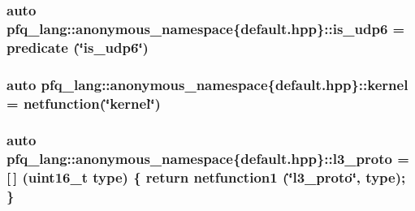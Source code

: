\hypertarget{namespacepfq__lang_1_1anonymous__namespace_02default_8hpp_03_a31e93829d19f72f4aece81f57d7cef9c}{
\subsubsection[{is\-\_\-udp6}]{\setlength{\rightskip}{0pt plus 5cm}auto pfq\-\_\-lang\-::anonymous\-\_\-namespace\{default.\-hpp\}\-::is\-\_\-udp6 = {\bf predicate} (\char`\"{}is\-\_\-udp6\char`\"{})}}\label{namespacepfq__lang_1_1anonymous__namespace_02default_8hpp_03_a31e93829d19f72f4aece81f57d7cef9c}
\hypertarget{namespacepfq__lang_1_1anonymous__namespace_02default_8hpp_03_a68a2502f951a2b671a7d0496609f5d2a}{
\subsubsection[{kernel}]{\setlength{\rightskip}{0pt plus 5cm}auto pfq\-\_\-lang\-::anonymous\-\_\-namespace\{default.\-hpp\}\-::kernel = {\bf netfunction}(\char`\"{}kernel\char`\"{})}}\label{namespacepfq__lang_1_1anonymous__namespace_02default_8hpp_03_a68a2502f951a2b671a7d0496609f5d2a}
\hypertarget{namespacepfq__lang_1_1anonymous__namespace_02default_8hpp_03_aed01dd5380a873d92397ec0d4c07abac}{
\subsubsection[{l3\-\_\-proto}]{\setlength{\rightskip}{0pt plus 5cm}auto pfq\-\_\-lang\-::anonymous\-\_\-namespace\{default.\-hpp\}\-::l3\-\_\-proto = \mbox{[}$\,$\mbox{]} (uint16\-\_\-t type) \{ return {\bf netfunction1} (\char`\"{}l3\-\_\-proto\char`\"{}, type); \}}}\label{namespacepfq__lang_1_1anonymous__namespace_02default_8hpp_03_aed01dd5380a873d92397ec0d4c07abac}
